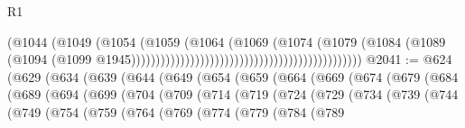 \begin{lexlean}{R1}
\begin{coremodule}
{{{{{{{{{{{{{{{{{{{{{{{{{{{{{{{{{{{{{{{{                                                                          (@1044
                                                                            (@1049
                                                                              (@1054
                                                                                (@1059
                                                                                  (@1064
                                                                                    (@1069
                                                                                      (@1074
                                                                                        (@1079
                                                                                          (@1084
                                                                                            (@1089
                                                                                              (@1094
                                                                                                (@1099
                                                                                                  @1945)))))))))))))))))))))))))))))))))))))))))))))))
@2041 := @624
    (@629
      (@634
        (@639
          (@644
            (@649
              (@654
                (@659
                  (@664
                    (@669
                      (@674
                        (@679
                          (@684
                            (@689
                              (@694
                                (@699
                                  (@704
                                    (@709
                                      (@714
                                        (@719
                                          (@724
                                            (@729
                                              (@734
                                                (@739
                                                  (@744
                                                    (@749
                                                      (@754
                                                        (@759
                                                          (@764
                                                            (@769
                                                              (@774
                                                                (@779
                                                                  (@784
                                                                    (@789
}}}}}}}}}}}}}}}}}}}}}}}}}}}}}}}}}}}}}}}}
\end{coremodule}
\end{lexlean}
